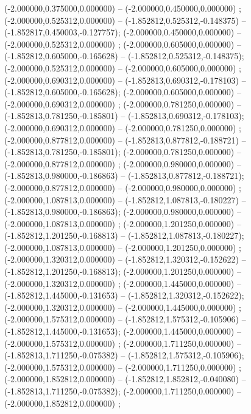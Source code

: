  (-2.000000,0.375000,0.000000) -- (-2.000000,0.450000,0.000000) ;
 (-2.000000,0.525312,0.000000) -- (-1.852812,0.525312,-0.148375) -- (-1.852817,0.450003,-0.127757);
 (-2.000000,0.450000,0.000000) -- (-2.000000,0.525312,0.000000) ;
 (-2.000000,0.605000,0.000000) -- (-1.852812,0.605000,-0.165628) -- (-1.852812,0.525312,-0.148375);
 (-2.000000,0.525312,0.000000) -- (-2.000000,0.605000,0.000000) ;
 (-2.000000,0.690312,0.000000) -- (-1.852813,0.690312,-0.178103) -- (-1.852812,0.605000,-0.165628);
 (-2.000000,0.605000,0.000000) -- (-2.000000,0.690312,0.000000) ;
 (-2.000000,0.781250,0.000000) -- (-1.852813,0.781250,-0.185801) -- (-1.852813,0.690312,-0.178103);
 (-2.000000,0.690312,0.000000) -- (-2.000000,0.781250,0.000000) ;
 (-2.000000,0.877812,0.000000) -- (-1.852813,0.877812,-0.188721) -- (-1.852813,0.781250,-0.185801);
 (-2.000000,0.781250,0.000000) -- (-2.000000,0.877812,0.000000) ;
 (-2.000000,0.980000,0.000000) -- (-1.852813,0.980000,-0.186863) -- (-1.852813,0.877812,-0.188721);
 (-2.000000,0.877812,0.000000) -- (-2.000000,0.980000,0.000000) ;
 (-2.000000,1.087813,0.000000) -- (-1.852812,1.087813,-0.180227) -- (-1.852813,0.980000,-0.186863);
 (-2.000000,0.980000,0.000000) -- (-2.000000,1.087813,0.000000) ;
 (-2.000000,1.201250,0.000000) -- (-1.852812,1.201250,-0.168813) -- (-1.852812,1.087813,-0.180227);
 (-2.000000,1.087813,0.000000) -- (-2.000000,1.201250,0.000000) ;
 (-2.000000,1.320312,0.000000) -- (-1.852812,1.320312,-0.152622) -- (-1.852812,1.201250,-0.168813);
 (-2.000000,1.201250,0.000000) -- (-2.000000,1.320312,0.000000) ;
 (-2.000000,1.445000,0.000000) -- (-1.852812,1.445000,-0.131653) -- (-1.852812,1.320312,-0.152622);
 (-2.000000,1.320312,0.000000) -- (-2.000000,1.445000,0.000000) ;
 (-2.000000,1.575312,0.000000) -- (-1.852812,1.575312,-0.105906) -- (-1.852812,1.445000,-0.131653);
 (-2.000000,1.445000,0.000000) -- (-2.000000,1.575312,0.000000) ;
 (-2.000000,1.711250,0.000000) -- (-1.852813,1.711250,-0.075382) -- (-1.852812,1.575312,-0.105906);
 (-2.000000,1.575312,0.000000) -- (-2.000000,1.711250,0.000000) ;
 (-2.000000,1.852812,0.000000) -- (-1.852812,1.852812,-0.040080) -- (-1.852813,1.711250,-0.075382);
 (-2.000000,1.711250,0.000000) -- (-2.000000,1.852812,0.000000) ;
